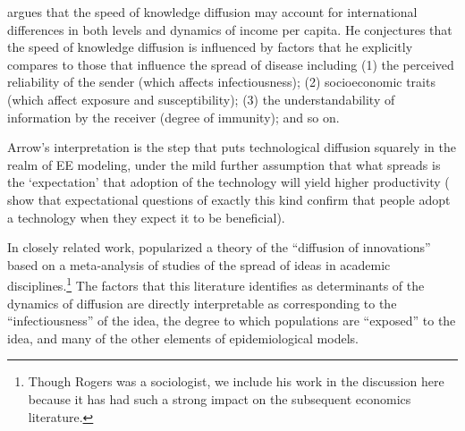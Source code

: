 \href{https://github.com/iworld1991/EpiExp/blob/master/Literature/arrow_classificatory_1969.pdf}{\cite{arrow_classificatory_1969}} argues that the speed of knowledge diffusion may account for international differences in both levels and dynamics of income per capita. He conjectures that the speed of knowledge diffusion is influenced by factors that he explicitly compares to  those that influence the spread of disease including (1) the perceived reliability of the sender (which affects infectiousness); (2) socioeconomic traits (which affect exposure and susceptibility); (3) the understandability of information by the receiver (degree of immunity); and so on.

Arrow's interpretation is the step that puts technological diffusion squarely in the realm of EE modeling, under the mild further assumption that what spreads is the `expectation' that adoption of the technology will yield higher productivity (\cite{banerjee2013diffusion} show that expectational questions of exactly this kind confirm that people adopt a technology when they expect it to be beneficial).

In closely related work, \href{https://en.wikipedia.org/wiki/Diffusion_of_innovations}{\cite{rogers1962diffusion}} popularized a theory of the ``diffusion of innovations'' based on a meta-analysis of studies of the spread of ideas in academic disciplines.\footnote{Though Rogers was a sociologist, we include his work in the discussion here because it has had such a strong impact on the subsequent economics literature.}  The factors that this literature identifies as determinants of the dynamics of diffusion are directly interpretable as corresponding to the ``infectiousness'' of the idea, the degree to which populations are ``exposed'' to the idea, and many of the other elements of epidemiological models.

